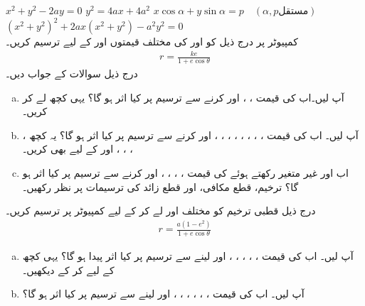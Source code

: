 $x^2+y^2-2ay=0$
$y^2=4ax+4a^2$
$x\cos\alpha+y\sin\alpha=p\quad (\alpha, p \text{مستقل})$
$(x^2+y^2)^2+2ax(x^2+y^2)-a^2y^2=0$
\\
کمپیوٹر پر درج ذیل کو  اور  کی مختلف قیمتوں اور  کے لیے ترسیم کریں۔
\begin{align*}
r=\frac{ke}{1+e\cos\theta}
\end{align*}
درج ذیل سوالات کے جواب دیں۔
\begin{enumerate}[a.]
\item
آپ  لیں۔اب  کی قیمت ، ،  اور  کرنے سے ترسیم پر کیا اثر ہو گا؟ یہی کچھ  لے کر کریں۔ 
\item
آپ  لیں۔ اب  کی قیمت ، ، ، ، ، ، ،  ، اور  کرنے سے ترسیم پر کیا اثر ہو گا؟ یہ کچھ ، ، ، ،  اور  کے لیے بھی  کریں۔
\item
اب  اور غیر متغیر رکھتے ہوئے  کی قیمت ، ، ،  ، اور  کرنے سے ترسیم پر کیا اثر ہو گا؟ ترخیم، قطع مکافی،  اور قطع زائد کی ترسیمات پر نظر رکھیں۔
\end{enumerate}
درج ذیل قطبی ترخیم کو مختلف اور    لے کر    کے لیے  کمپیوٹر پر ترسیم کریں۔
\begin{align*}
r=\frac{a(1-e^2)}{1+e\cos\theta}
\end{align*}
\begin{enumerate}[a.]
\item
آپ  لیں۔ اب  کی قیمت ، ، ، ، ،  اور  لینے سے ترسیم پر کیا اثر پیدا ہو گا؟ یہی کچھ  کے لیے کر کے دیکھیں۔
\item
آپ لیں۔ اب  کی قیمت ، ، ، ، ،  ، اور  لینے سے ترسیم  پر کیا اثر ہو گا؟
\end{enumerate}

